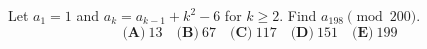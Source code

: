 Let $a_1=1$ and $a_k=a_{k-1}+k^2-6$ for $k\ge2$. Find $a_{198}\pmod{200}$.
\[\textbf{(A)}~13\quad\textbf{(B)}~67\quad\textbf{(C)}~117\quad\textbf{(D)}~151\quad\textbf{(E)}~199\]

